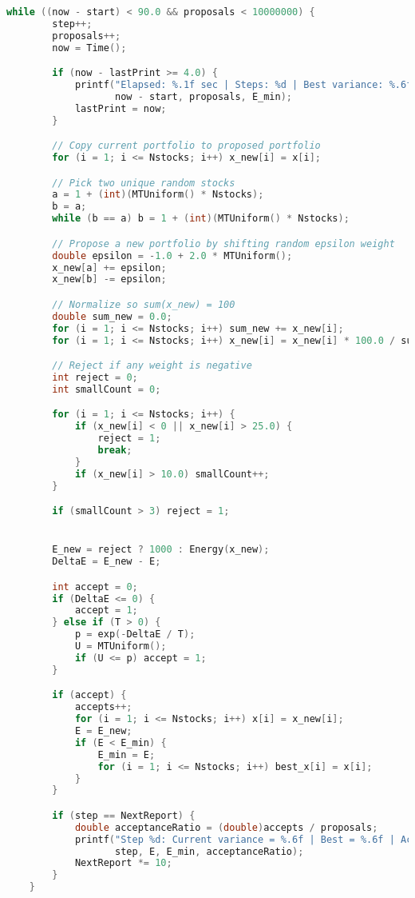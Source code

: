\documentclass{report}
\begin{document}
\begin{lstlisting}[language=c++]
    while ((now - start) < 90.0 && proposals < 10000000) {
        step++;
        proposals++;
        now = Time();

        if (now - lastPrint >= 4.0) {
            printf("Elapsed: %.1f sec | Steps: %d | Best variance: %.6f\n",
                   now - start, proposals, E_min);
            lastPrint = now;
        }

        // Copy current portfolio to proposed portfolio 
        for (i = 1; i <= Nstocks; i++) x_new[i] = x[i];

        // Pick two unique random stocks
        a = 1 + (int)(MTUniform() * Nstocks);
        b = a;
        while (b == a) b = 1 + (int)(MTUniform() * Nstocks);

        // Propose a new portfolio by shifting random epsilon weight
        double epsilon = -1.0 + 2.0 * MTUniform();
        x_new[a] += epsilon;
        x_new[b] -= epsilon;

        // Normalize so sum(x_new) = 100
        double sum_new = 0.0;
        for (i = 1; i <= Nstocks; i++) sum_new += x_new[i];
        for (i = 1; i <= Nstocks; i++) x_new[i] = x_new[i] * 100.0 / sum_new;

        // Reject if any weight is negative
        int reject = 0;
        int smallCount = 0;

        for (i = 1; i <= Nstocks; i++) {
            if (x_new[i] < 0 || x_new[i] > 25.0) {
                reject = 1;
                break;
            }
            if (x_new[i] > 10.0) smallCount++;
        }

        if (smallCount > 3) reject = 1;


        E_new = reject ? 1000 : Energy(x_new);
        DeltaE = E_new - E;

        int accept = 0;
        if (DeltaE <= 0) {
            accept = 1;
        } else if (T > 0) {
            p = exp(-DeltaE / T);
            U = MTUniform();
            if (U <= p) accept = 1;
        }

        if (accept) {
            accepts++;
            for (i = 1; i <= Nstocks; i++) x[i] = x_new[i];
            E = E_new;
            if (E < E_min) {
                E_min = E;
                for (i = 1; i <= Nstocks; i++) best_x[i] = x[i];
            }
        }

        if (step == NextReport) {
            double acceptanceRatio = (double)accepts / proposals;
            printf("Step %d: Current variance = %.6f | Best = %.6f | Acceptance ratio = %.4f\n",
                   step, E, E_min, acceptanceRatio);
            NextReport *= 10;
        }
    }


\end{lstlisting}
\end{document}
